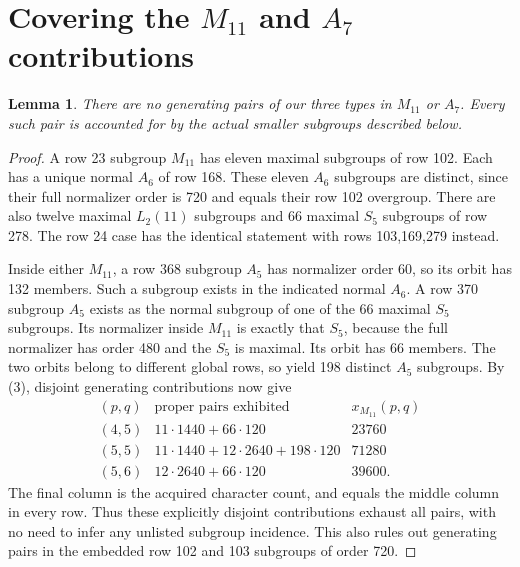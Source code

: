 \documentclass[11pt,a4paper]{article}
\newtheorem{lemma}{Lemma}\newtheorem{theorem}{Theorem}
\begin{document}
\section*{Covering the $M_{11}$ and $A_7$ contributions}
\begin{lemma}\label{saturation}
There are no generating pairs of our three types in $M_{11}$ or
$A_7$. Every such pair is accounted for by the actual smaller
subgroups described below.
\end{lemma}
\begin{proof}
A row 23 subgroup $M_{11}$ has eleven maximal subgroups of row 102.
Each has a unique normal $A_6$ of row 168. These eleven $A_6$
subgroups are distinct, since their full normalizer order is 720
and equals their row 102 overgroup. There are also twelve maximal
$L_2(11)$ subgroups and 66 maximal $S_5$ subgroups of row 278.
The row 24 case has the identical statement with rows
103,169,279 instead.

Inside either $M_{11}$, a row 368 subgroup $A_5$ has normalizer
order 60, so its orbit has 132 members. Such a subgroup exists in
the indicated normal $A_6$. A row 370 subgroup $A_5$ exists as the
normal subgroup of one of the 66 maximal $S_5$ subgroups. Its
normalizer inside $M_{11}$ is exactly that $S_5$, because the
full normalizer has order 480 and the $S_5$ is maximal. Its orbit
has 66 members. The two orbits belong to different global rows,
so yield 198 distinct $A_5$ subgroups. By (3), disjoint generating
contributions now give
\[
\begin{array}{c|r|r}
(p,q)&\text{proper pairs exhibited}&x_{M_{11}}(p,q)\\\hline
(4,5)&11\cdot1440+66\cdot120&23760\\
(5,5)&11\cdot1440+12\cdot2640+198\cdot120&71280\\
(5,6)&12\cdot2640+66\cdot120&39600.
\end{array}
\]
The final column is the acquired character count, and equals the
middle column in every row. Thus these explicitly disjoint
contributions exhaust all pairs, with no need to infer any
unlisted subgroup incidence. This also rules out generating
pairs in the embedded row 102 and 103 subgroups of order 720.


\end{proof}
\end{document}
